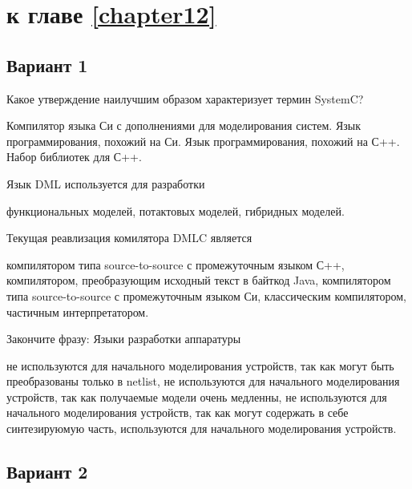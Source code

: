 \section{\Questions к главе \ref{chapter12}} %

\subsection*{Вариант 1}

\begin{questions}

\question[3] Какое утверждение наилучшим образом характеризует термин SystemC?
\begin{choices}
	\choice Компилятор языка Си с дополнениями для моделирования систем.
	\choice Язык программирования, похожий на Си.
    \choice Язык программирования, похожий на С++.
	\correctchoice Набор библиотек для С++.
\end{choices}

\question[3] Язык DML используется для разработки
\begin{choices}
	\correctchoice функциональных моделей,
    \choice потактовых моделей,
    \choice гибридных моделей.
\end{choices}

\question[3] Текущая реавлизация комилятора DMLC является
\begin{choices}
    \choice компилятором типа source-to-source с промежуточным языком С++,
    \choice компилятором, преобразующим исходный текст в байткод Java,
	\correctchoice компилятором типа source-to-source с промежуточным языком Си,
    \choice классическим компилятором,
    \choice частичным интерпретатором.
\end{choices}

\question[3] Закончите фразу: Языки разработки аппаратуры
\begin{choices}
\choice не используются для начального моделирования устройств, так как могут быть преобразованы только в netlist,
\correctchoice не используются для начального моделирования устройств, так как получаемые модели очень медленны,
\choice не используются для начального моделирования устройств, так как могут содержать в себе синтезируюмую часть,
\choice используются для начального моделирования устройств.
\end{choices}

\end{questions}

\subsection*{Вариант 2}

